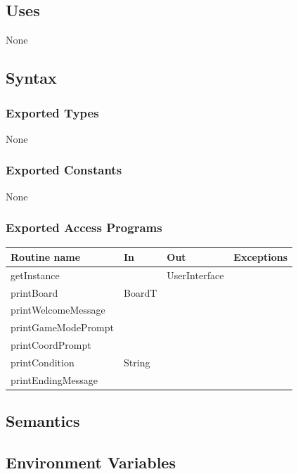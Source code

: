 \documentclass[12pt]{article}
\begin{document}
\subsection* {Uses}

None

\subsection* {Syntax}

\subsubsection* {Exported Types}

None

\subsubsection* {Exported Constants}

None

\subsubsection* {Exported Access Programs}

\begin{tabular}{| l | l | l | p{6cm} |}
\hline
\textbf{Routine name} & \textbf{In} & \textbf{Out} & \textbf{Exceptions}\\
\hline
getInstance & ~ & UserInterface &  \\
\hline
printBoard & BoardT & ~ & \\
\hline
printWelcomeMessage & ~ & ~ & \\
\hline
printGameModePrompt & ~ & ~ & \\
\hline
printCoordPrompt & ~ & ~ & \\
\hline
printCondition & String & ~ & \\
\hline
printEndingMessage & ~ & ~ & \\
\hline
\end{tabular}

\subsection* {Semantics}

\subsection*{Environment Variables}
\end{document}
